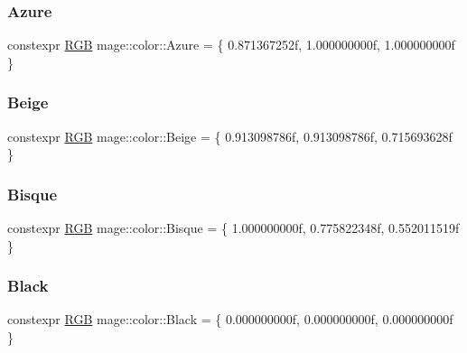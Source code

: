 \subsubsection{\texorpdfstring{Azure}{Azure}}
{\footnotesize\ttfamily constexpr \mbox{\hyperlink{structmage_1_1_r_g_b}{R\+GB}} mage\+::color\+::\+Azure = \{ 0.\+871367252f, 1.\+000000000f, 1.\+000000000f \}}

\mbox{\label{namespacemage_1_1color_a26bfb42ab556acd93a90a8c16f0d6c28}} 
\subsubsection{\texorpdfstring{Beige}{Beige}}
{\footnotesize\ttfamily constexpr \mbox{\hyperlink{structmage_1_1_r_g_b}{R\+GB}} mage\+::color\+::\+Beige = \{ 0.\+913098786f, 0.\+913098786f, 0.\+715693628f \}}

\mbox{\label{namespacemage_1_1color_a475426fc358c0aa9f4e222003a273a1d}} 
\subsubsection{\texorpdfstring{Bisque}{Bisque}}
{\footnotesize\ttfamily constexpr \mbox{\hyperlink{structmage_1_1_r_g_b}{R\+GB}} mage\+::color\+::\+Bisque = \{ 1.\+000000000f, 0.\+775822348f, 0.\+552011519f \}}

\mbox{\label{namespacemage_1_1color_a1395fb0c23b604e389b2d81fd0670bdc}} 
\subsubsection{\texorpdfstring{Black}{Black}}
{\footnotesize\ttfamily constexpr \mbox{\hyperlink{structmage_1_1_r_g_b}{R\+GB}} mage\+::color\+::\+Black = \{ 0.\+000000000f, 0.\+000000000f, 0.\+000000000f \}}

\mbox{\label{namespacemage_1_1color_a1ffaefe9ca0592fa48fa321b694fd489}} 
